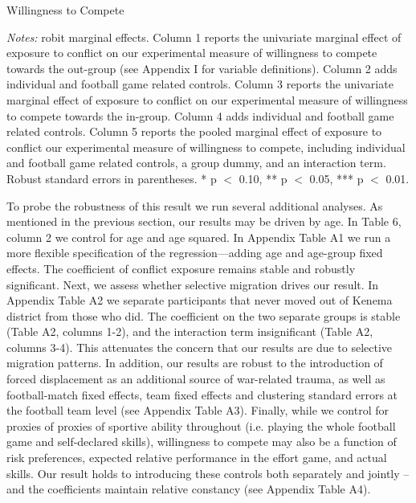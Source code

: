 \begin{threeparttable}[htb]
	\caption{Willingness to Compete}
	\label{tab:slf:compete}
	\centering
	
	\begin{tablenotes}
		\item \textit{Notes:} robit marginal effects. Column 1 reports the univariate marginal effect of exposure to conflict on our experimental measure of willingness to compete towards the out-group (see Appendix I for variable definitions). Column 2 adds individual and football game related controls. Column 3 reports the univariate marginal effect of exposure to conflict on our experimental measure of willingness to compete towards the in-group. Column 4 adds individual and football game related controls. Column 5 reports the pooled marginal effect of exposure to conflict our experimental measure of willingness to compete, including individual and football game related controls, a group dummy, and an interaction term. Robust standard errors in parentheses. * p $<$ 0.10, ** p $<$ 0.05, *** p $<$ 0.01.
		\item
	\end{tablenotes}
\end{threeparttable}


To probe the robustness of this result we run several additional analyses. As mentioned in the previous section, our results may be driven by age. In Table 6, column 2 we control for age and age squared. In Appendix Table A1 we run a more flexible specification of the regression—adding age and age-group fixed effects. The coefficient of conflict exposure remains stable and robustly significant. Next, we assess whether selective migration drives our result. In Appendix Table A2 we separate participants that never moved out of Kenema district from those who did. The coefficient on the two separate groups is stable (Table A2, columns 1-2), and the interaction term insignificant (Table A2, columns 3-4).  This attenuates the concern that our results are due to selective migration patterns. In addition, our results are robust to the introduction of forced displacement as an additional source of war-related trauma, as well as football-match fixed effects, team fixed effects and clustering standard errors at the football team level (see Appendix Table A3). Finally, while we control for proxies of proxies of sportive ability throughout (i.e. playing the whole football game and self-declared skills), willingness to compete may also be a function of risk preferences, expected relative performance in the effort game, and actual skills. Our result holds to introducing these controls both separately and jointly – and the coefficients maintain relative constancy (see Appendix Table A4).


